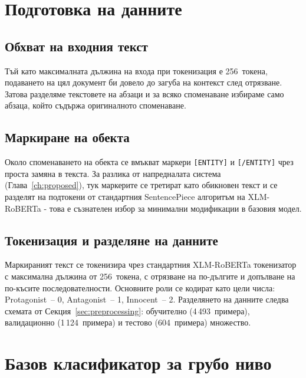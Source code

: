 \documentclass[12pt,a4paper]{report}
\begin{document}
\section{Подготовка на данните}

\subsection{Обхват на входния текст}

Тъй като максималната дължина на входа при токенизация е 256~токена, подаването на цял документ би довело до загуба на контекст след отрязване. Затова разделяме текстовете на абзаци и за всяко споменаване избираме само абзаца, който съдържа оригиналното споменаване.

\subsection{Маркиране на обекта}

Около споменаването на обекта се вмъкват маркери \texttt{[ENTITY]} и \texttt{[/ENTITY]} чрез проста замяна в текста. За разлика от напредналата система (Глава~\ref{ch:proposed}), тук маркерите се третират като обикновен текст и се разделят на подтокени от стандартния SentencePiece алгоритъм на XLM-RoBERTa - това е съзнателен избор за минимални модификации в базовия модел.

\subsection{Токенизация и разделяне на данните}

Маркираният текст се токенизира чрез стандартния XLM-RoBERTa токенизатор с максимална дължина от 256~токена, с отрязване на по-дългите и допълване на по-късите последователности. Основните роли се кодират като цели числа: Protagonist~-- 0, Antagonist~-- 1, Innocent~-- 2. Разделянето на данните следва схемата от Секция~\ref{sec:preprocessing}: обучително (4\,493~примера), валидационно (1\,124~примера) и тестово (604~примера) множество.


\section{Базов класификатор за грубо ниво}
\end{document}
